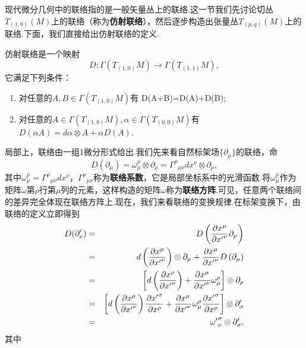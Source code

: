 		现代微分几何中的联络指的是一般矢量丛上的联络.这一节我们先讨论切丛$T_{(1,0)}(M)$上的联络（称为\textbf{仿射联络}），然后逐步构造出张量丛$T_{(p,q)}(M)$上的联络.下面，我们直接给出仿射联络的定义.
		\begin{definition}
			仿射联络是一个映射
			\begin{equation*}
				D:\varGamma(T_{(1,0)}M)\rightarrow \varGamma(T_{(1,1)}M),
			\end{equation*}
			它满足下列条件：
			\begin{enumerate}
				\item 对任意的$A,B\in \varGamma(T_{(1,0)}M)$有 D(A+B)=D(A)+D(B);						
				\item 对任意的$A\in \varGamma(T_{(1,0)}M),\alpha\in \varGamma(T_{(0,0)}M)$有$D(\alpha A)=d\alpha\otimes A+\alpha D(A)$.
			\end{enumerate}
		\end{definition}
		局部上，联络由一组1微分形式给出.我们先来看自然标架场$\{\partial_\mu\}$的联络，命
		\begin{equation}
		D(\partial_\mu)=\omega^\rho_\mu \otimes\partial_\rho={\varGamma^\rho}_{\mu\nu}dx^\nu\otimes \partial_\rho,
		\end{equation} 
		其中$\omega^\rho_\mu={\varGamma^\rho}_{\mu\nu}dx^\nu$，${\varGamma^\rho}_{\mu\nu}$称为\textbf{联络系数}，它是局部坐标系中的光滑函数.将$\omega^\rho_\mu$作为矩阵$\omega$第$\rho$行第$\mu$列的元素，这样构造的矩阵$\omega$称为\textbf{联络方阵}.可见，任意两个联络间的差异完全体现在联络方阵上.现在，我们来看联络的变换规律.在标架变换下，由联络的定义立即得到
		\begin{eqnarray}
			D(\partial'_\nu)&=&D\left(\frac{\partial{x^\mu}}{\partial{x'}^\nu}{\partial}_\mu\right)\notag\\
			&=&d\left(\frac{\partial{x^\mu}}{\partial{x'}^\nu}\right)\otimes{\partial}_\mu+\frac{\partial{x^\mu}}{\partial{x'}^\nu}D\left({\partial}_\mu\right)\notag\\
			&=&\left[d\left(\frac{\partial{x^\rho}}{\partial{x'}^\nu}\right)+\frac{\partial{x^\mu}}{\partial{x'}^\nu}\omega^\rho_\mu\right]\otimes{\partial}_\rho\notag\\
			&=&\left[d\left(\frac{\partial{x^\rho}}{\partial{x'}^\nu}\right)\frac{\partial{{x'}^\sigma}}{\partial{x^\rho}}+\frac{\partial{x^\mu}}{\partial{x'}^\nu}\omega^\rho_\mu\frac{\partial{{x'}^\sigma}}{\partial{x^\rho}}\right]\otimes\partial'_\sigma\notag\\
			&=&{\omega'}^\sigma_\nu\otimes\partial'_\sigma,
		\end{eqnarray}
		其中
